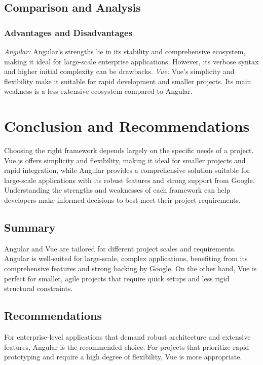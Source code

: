\documentclass[conference]{IEEEtran}
\begin{document}
\subsection{Comparison and Analysis}
\subsubsection{Advantages and Disadvantages}
\textit{Angular: }Angular's strengths lie in its stability and comprehensive ecosystem, making it ideal for large-scale enterprise applications. However, its verbose syntax and higher initial complexity can be drawbacks.
\newline\textit{Vue: }Vue's simplicity and flexibility make it suitable for rapid development and smaller projects. Its main weakness is a less extensive ecosystem compared to Angular.

\section{Conclusion and Recommendations}
Choosing the right framework depends largely on the specific needs of a project. Vue.js offers simplicity and flexibility, making it ideal for smaller projects and rapid integration, while Angular provides a comprehensive solution suitable for large-scale applications with its robust features and strong support from Google. Understanding the strengths and weaknesses of each framework can help developers make informed decisions to best meet their project requirements.

\subsection{Summary}
Angular and Vue are tailored for different project scales and requirements. Angular is well-suited for large-scale, complex applications, benefiting from its comprehensive features and strong backing by Google. On the other hand, Vue is perfect for smaller, agile projects that require quick setups and less rigid structural constraints.

\subsection{Recommendations}
For enterprise-level applications that demand robust architecture and extensive features, Angular is the recommended choice. For projects that prioritize rapid prototyping and require a high degree of flexibility, Vue is more appropriate.
\end{document}
